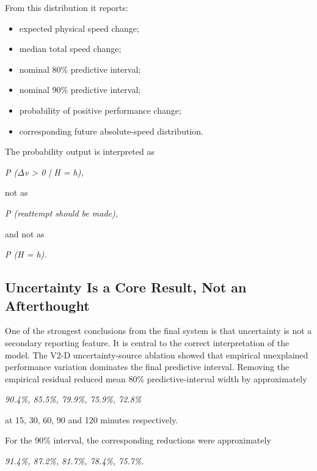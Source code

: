 From this distribution it reports:

\begin{itemize}
\item expected physical speed change;
\item median total speed change;
\item nominal 80\% predictive interval;
\item nominal 90\% predictive interval;
\item probability of positive performance change;
\item corresponding future absolute-speed distribution.
\end{itemize}

The probability output is interpreted as

\begin{center}\textit{P (\ensuremath{\Delta}v > 0 | H = h),}\end{center}

not as

\begin{center}\textit{P (reattempt should be made),}\end{center}

and not as

\begin{center}\textit{P (H = h).}\end{center}

\subsection{Uncertainty Is a Core Result, Not an Afterthought}
One of the strongest conclusions from the final system is that uncertainty is not a secondary reporting feature. It is central to the correct interpretation of the model. The V2-D uncertainty-source ablation showed that empirical unexplained performance variation dominates the final predictive interval. Removing the empirical residual reduced mean 80\% predictive-interval width by approximately

\begin{center}\textit{90.4\%, 85.5\%, 79.9\%, 75.9\%, 72.8\%}\end{center}

at 15, 30, 60, 90 and 120 minutes respectively.

For the 90\% interval, the corresponding reductions were approximately

\begin{center}\textit{91.4\%, 87.2\%, 81.7\%, 78.4\%, 75.7\%.}\end{center}

